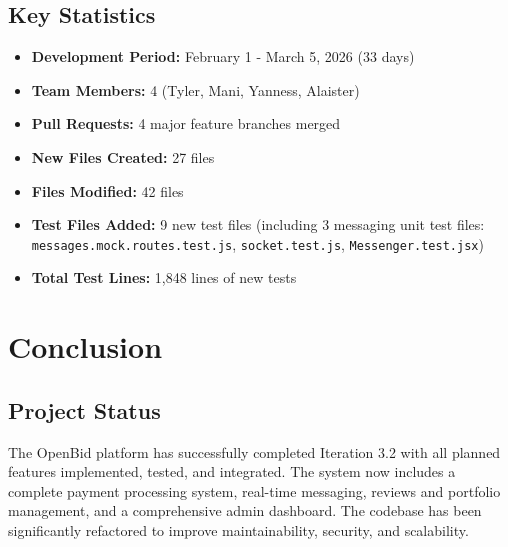 \documentclass[11pt]{article}
\begin{document}
\subsection{Key Statistics}
\begin{itemize}[leftmargin=1.4em]
  \item \textbf{Development Period:} February 1 - March 5, 2026 (33 days)
  \item \textbf{Team Members:} 4 (Tyler, Mani, Yanness, Alaister)
  \item \textbf{Pull Requests:} 4 major feature branches merged
  \item \textbf{New Files Created:} 27 files
  \item \textbf{Files Modified:} 42 files
  \item \textbf{Test Files Added:} 9 new test files (including 3 messaging unit test files: \texttt{messages.mock.routes.test.js}, \texttt{socket.test.js}, \texttt{Messenger.test.jsx})
  \item \textbf{Total Test Lines:} 1,848 lines of new tests
\end{itemize}

\section{Conclusion}

\subsection{Project Status}
The OpenBid platform has successfully completed Iteration 3.2 with all planned features implemented, tested, and integrated. The system now includes a complete payment processing system, real-time messaging, reviews and portfolio management, and a comprehensive admin dashboard. The codebase has been significantly refactored to improve maintainability, security, and scalability.
\end{document}
